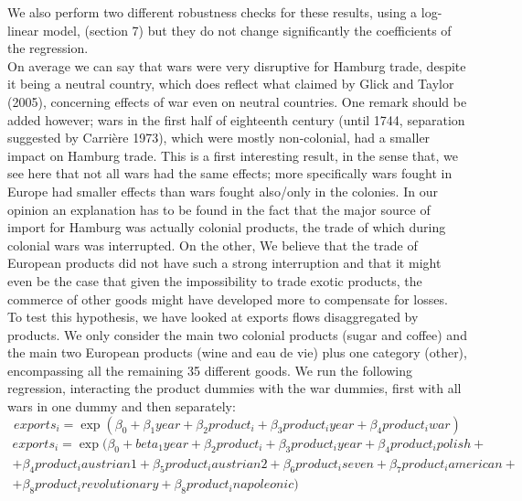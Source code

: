 \documentclass[12pt,a4paper,titlepage,english]{article}
\begin{document}
We also perform two different robustness checks for these results, using a log-linear model, (section 7) but they do not change significantly the coefficients of the regression. \\
On average we can say that wars were very disruptive for Hamburg trade, despite it being a neutral country, which does reflect what claimed by Glick and Taylor (2005), concerning effects of war even on neutral countries. One remark should be added however; wars in the first half of eighteenth century (until 1744, separation suggested by Carrière 1973), which were mostly non-colonial, had a smaller impact on Hamburg trade. This is a first interesting result, in the sense that, we see here that not all wars had the same effects; more specifically wars fought in Europe had smaller effects than wars fought also/only in the colonies. In our opinion an explanation has to be found in the fact that the major source of import for Hamburg was actually colonial products, the trade of which during colonial wars was interrupted. On the other, We believe that the trade of European products did not have such a strong interruption and that it might even be the case that given the impossibility to trade exotic products, the commerce of other goods might have developed more to compensate for losses. \\
To test this hypothesis, we have looked at exports flows disaggregated by products. We only consider the main two colonial products (sugar and coffee) and the main two European products (wine and eau de vie) plus one category (other), encompassing all the remaining 35 different goods. We run the following regression, interacting the product dummies with the war dummies, first with all wars in one dummy and then separately:
\begin{equation}
exports_i=\exp(\beta_0+\beta_1year+ 
\beta_2product_i + \beta_3product_iyear+\beta_4product_iwar)
\end{equation}
\begin{multline}
exports_i=\exp(\beta_0+beta_1year+\beta_2product_i + \beta_3product_iyear+\beta_4product_ipolish + \\ +\beta_4product_iaustrian1 + \beta_5product_iaustrian2 + \beta_6product_iseven +\beta_7product_iamerican+  \\ +\beta_8product_irevolutionary+\beta_8product_inapoleonic)
\end{multline}
\end{document}
